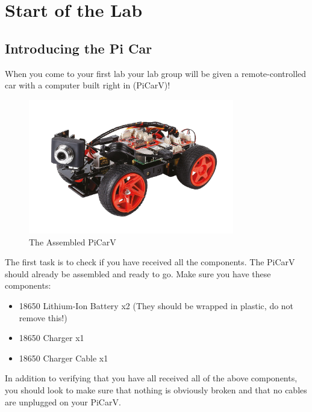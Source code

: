 \documentclass[11pt]{report}
\begin{document}
    \clearpage

    \chapter{Start of the Lab}

    \section{Introducing the Pi Car}
    When you come to your first lab your lab group will be given a remote-controlled car with a computer built right in (PiCarV)! 

    \begin{figure}[h]
        \centering
        \includegraphics[width=0.8\textwidth]{picarv.png}
        \caption{The Assembled PiCarV}
        \label{fig:The Assembled PiCarV}
    \end{figure}

    The first task is to check if you have received all the components. The PiCarV should already be assembled and ready to go. Make sure you have these components:

    \begin{itemize}
        \item 18650 Lithium-Ion Battery x2 (They should be wrapped in plastic, do not remove this!)
        \item 18650 Charger x1
        \item 18650 Charger Cable x1
    \end{itemize}

    In addition to verifying that you have all received all of the above components, you should look to make sure that nothing is obviously broken and that no cables are unplugged on your PiCarV.
\end{document}
